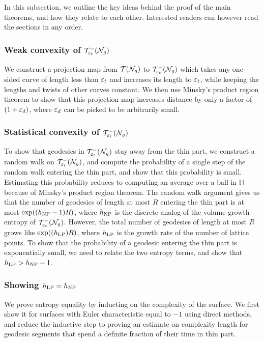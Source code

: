 In this subsection, we outline the key ideas behind the proof of the main theorems, and how they relate to each other.
Interested readers can however read the sections in any order.

\subsubsection*{Weak convexity of $\mathcal{T}_{\varepsilon_t}^{-}(\mathcal{N}_g)$}
We construct a projection map from $\mathcal{T}(\mathcal{N}_g)$ to $\mathcal{T}_{\varepsilon_t}^{-}(\mathcal{N}_g)$ which takes any one-sided curve of length less than $\varepsilon_t$ and increases its length to $\varepsilon_t$, while keeping the lengths and twists of other curves constant.
We then use Minsky's product region theorem to show that this projection map increases distance by only a factor of $(1 + \varepsilon_d)$, where $\varepsilon_d$ can be picked to be arbitrarily small.

\subsubsection*{Statistical convexity of $\mathcal{T}_{\varepsilon_t}^{-}(\mathcal{N}_g)$}
To show that geodesics in $\mathcal{T}_{\varepsilon_t}^{-}(\mathcal{N}_g)$ stay away from the thin part, we construct a random walk on $\mathcal{T}_{\varepsilon_t}^{-}(\mathcal{N}_g)$, and compute the probability of a single step of the random walk entering the thin part, and show that this probability is small.
Estimating this probability reduces to computing an average over a ball in $\mathbb{H}$ because of Minsky's product region theorem.
The random walk argument gives us that the number of geodesics of length at most $R$ entering the thin part is at most $\exp((h_{\mathrm{NP}} - 1)R)$, where $h_{\mathrm{NP}}$ is the discrete analog of the volume growth entropy of $\mathcal{T}_{\varepsilon_t}^{-}(\mathcal{N}_g)$.
However, the total number of geodesics of length at most $R$ grows like $\exp((h_{\mathrm{LP}})R)$, where $h_{\mathrm{LP}}$ is the growth rate of the number of lattice points.
To show that the probability of a geodesic entering the thin part is exponentially small, we need to relate the two entropy terms, and show that $h_{\mathrm{LP}} > h_{\mathrm{NP}} - 1$.

\subsubsection*{Showing $h_{\mathrm{LP}} = h_{\mathrm{NP}}$}
We prove entropy equality by inducting on the complexity of the surface.
We first show it for surfaces with Euler characteristic equal to $-1$ using direct methods, and reduce the inductive step to proving an estimate on complexity length for geodesic segments that spend a definite fraction of their time in thin part.


